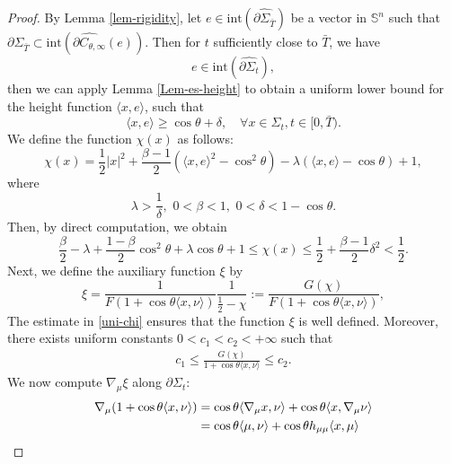 \documentclass[11pt,reqno]{amsart}
\theoremstyle{definition}
\theoremstyle{remark}
\numberwithin{equation}{section}
\renewcommand{\(}{\left(}
\renewcommand{\)}{\right)}
\renewcommand{\-}{\overline}
\begin{document}
\begin{proof}
By Lemma \ref{lem-rigidity}, let $e\in \mathrm{int}(\widehat{\partial\Sigma_{\bar{T}}})$ be a vector in $\mathbb{S}^{n}$ such that $\partial\Sigma_{\bar{T}}\subset\mathrm{int}(\widehat{\partial C_{\theta,\infty}}(e))$. Then for $t$ sufficiently close to $\bar{T}$, we have
\begin{equation*}
	e\in \mathrm{int}(\widehat{\partial\Sigma_{{t}}}),
\end{equation*}
then we can apply Lemma \ref{Lem-es-height} to obtain a uniform lower bound for the height function $\langle x,e\rangle$, such that 
\begin{equation}\label{lower-height}
	\langle x,e\rangle\geq \cos\theta+\delta,\quad \forall x\in\Sigma_t,t\in[0,\bar{T}).
\end{equation}
We define the function $\chi(x)$ as follows:
\begin{equation}
	\chi(x)=\frac{1}{2}|x|^2+\frac{\beta-1}{2}(\langle x,e\rangle^2-\cos^2{\theta})-\lambda(\langle x,e\rangle-\cos\theta)+1,
\end{equation}
where 
\begin{equation*}
	\lambda>\frac{1}{\delta},\,\,0<\beta<1,\,\,0<\delta<1-\cos\theta.
\end{equation*}
Then, by direct computation, we obtain
\begin{equation}\label{uni-chi}
	\frac{\beta}{2}-\lambda+\frac{1-\beta}{2}\cos^2{\theta}+\lambda\cos\theta+1\leq \chi(x)\leq \frac{1}{2}+\frac{\beta-1}{2}\delta^2< \frac{1}{2}.
\end{equation}
Next, we define the auxiliary function $\xi$ by
\begin{equation}
	\xi=\frac{1}{F(1+\cos\theta\langle x,\nu \rangle)}\frac{1}{\frac{1}{2}-\chi}:=\frac{G(\chi)}{F(1+\cos\theta\langle x,\nu \rangle)},
\end{equation}
The estimate in \eqref{uni-chi} ensures that the function $\xi$ is well defined. Moreover,  there exists uniform constants $0<c_1<c_2<+\infty$ such that 
\begin{align}\label{uni-G}
c_1\leq	\frac{G(\chi)}{1+\cos\theta\langle x,\nu \rangle}\leq c_2.
\end{align}
We now compute $\nabla_{\mu}{\xi}$ along $\partial\Sigma_t$:
\begin{align}
	\nabla_{\mu}(1+\cos\theta\langle x,\nu \rangle)&=\cos\theta\langle\nabla_{\mu}{x},\nu \rangle+\cos\theta\langle x,\nabla_{\mu}{\nu}\rangle\notag\\
	&=\cos\theta\langle \mu,\nu\rangle+\cos\theta h_{\mu\mu}\langle x,\mu \rangle\notag\\

\end{align}
\end{proof}
\end{document}
